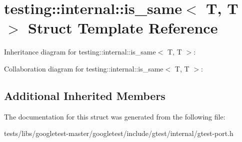 \hypertarget{structtesting_1_1internal_1_1is__same_3_01T_00_01T_01_4}{}\section{testing\+:\+:internal\+:\+:is\+\_\+same$<$ T, T $>$ Struct Template Reference}
\label{structtesting_1_1internal_1_1is__same_3_01T_00_01T_01_4}


Inheritance diagram for testing\+:\+:internal\+:\+:is\+\_\+same$<$ T, T $>$\+:


Collaboration diagram for testing\+:\+:internal\+:\+:is\+\_\+same$<$ T, T $>$\+:
\subsection*{Additional Inherited Members}


The documentation for this struct was generated from the following file\+:\begin{DoxyCompactItemize}
\item 
tests/libs/googletest-\/master/googletest/include/gtest/internal/gtest-\/port.\+h\end{DoxyCompactItemize}
